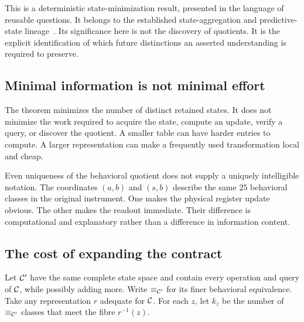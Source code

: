 This is a deterministic state-minimization result, presented in the language of reusable questions. It belongs to the established state-aggregation and predictive-state lineage~\cite{MU:givan,MU:shalizi}. Its significance here is not the discovery of quotients. It is the explicit identification of which future distinctions an asserted understanding is required to preserve.

\subsection{Minimal information is not minimal effort}
The theorem minimizes the number of distinct retained states. It does not minimize the work required to acquire the state, compute an update, verify a query, or discover the quotient. A smaller table can have harder entries to compute. A larger representation can make a frequently used transformation local and cheap.

Even uniqueness of the behavioral quotient does not supply a uniquely intelligible notation. The coordinates $(a,b)$ and $(s,b)$ describe the same $25$ behavioral classes in the original instrument. One makes the physical register update obvious. The other makes the readout immediate. Their difference is computational and explanatory rather than a difference in information content.

\subsection{The cost of expanding the contract}
Let $\mathcal C'$ have the same complete state space and contain every operation and query of $\mathcal C$, while possibly adding more. Write $\equiv_{\mathcal C'}$ for its finer behavioral equivalence. Take any representation $r$ adequate for $\mathcal C$. For each $z$, let $k_z$ be the number of $\equiv_{\mathcal C'}$ classes that meet the fibre $r^{-1}(z)$.

